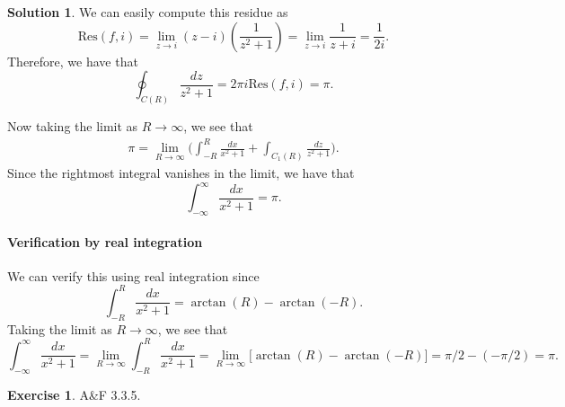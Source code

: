 \documentclass[12pt]{article}
\newcommand{\Res}{\text{Res}}
\theoremstyle{definition}
\newtheorem{exer}{Exercise}
\newtheorem{sol}{Solution}
\theoremstyle{remark}
\begin{document}
\begin{sol}
We can easily compute this residue as 
\begin{equation}
    \Res(f, i) = \lim\limits_{z\to i} (z-i)\left(\frac{1}{z^2+1}\right) = \lim\limits_{z\to i} \frac{1}{z+i} = \frac{1}{2i}.
\end{equation}
Therefore, we have that
\begin{equation}
    \oint_{C(R)} \frac{dz}{z^2 + 1} = 2\pi i \Res(f, i) = \pi.
\end{equation}

Now taking the limit as $R\to\infty$, we see that
\begin{align}
    \pi = \lim\limits_{R\to \infty}\Big( \int_{-R}^{R} \frac{dx}{x^2+1} + \int_{C_1(R)}  \frac{dz}{z^2 + 1} \Big).
\end{align}
Since the rightmost integral vanishes in the limit, we have that
\begin{equation}
    \int_{-\infty}^{\infty} \frac{dx}{x^2 + 1} = \pi.
\end{equation}

\paragraph{Verification by real integration}%
\label{par:verification_by_real_integration}


We can verify this using real integration since 
\begin{equation}
    \int_{-R}^{R} \frac{dx}{x^2 + 1} = \arctan(R) - \arctan(-R).
\end{equation}
Taking the limit as $R\to \infty$, we see that 
\begin{equation}
    \int_{-\infty}^{\infty} \frac{dx}{x^2 + 1} = \lim\limits_{R\to\infty}  \int_{-R}^{R} \frac{dx}{x^2 + 1} =  \lim\limits_{R\to\infty} \Big[ \arctan(R) - \arctan(-R) \Big] = \pi/2 - (-\pi/2) = \pi.
\end{equation}
\end{sol}
\newpage

\begin{exer}
    A\&F 3.3.5.
\end{exer}
\end{document}
